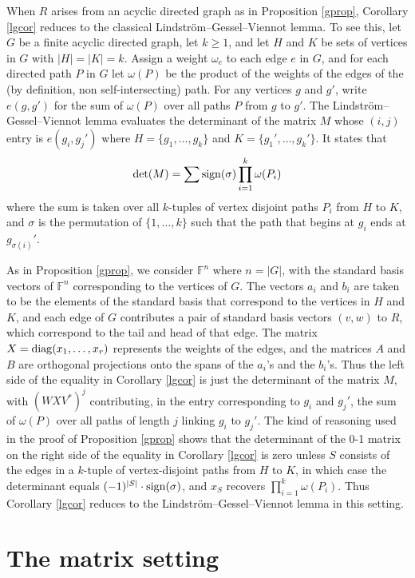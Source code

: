 \documentclass{amsart}
\theoremstyle{definition}
\begin{document}
When $R$ arises from an acyclic directed graph as in Proposition \ref{gprop}, Corollary \ref{lgcor} reduces to the classical Lindström–Gessel–Viennot lemma. To see this, let $G$ be a finite acyclic directed graph, let $k \geq 1$, and let $H$ and $K$ be sets of vertices in $G$ with $|H| = |K| = k$. Assign a weight $\omega_e$ to each edge $e$ in $G$, and for each directed path $P$ in $G$ let $\omega(P)$ be the product of the weights of the edges of the (by definition, non self-intersecting) path. For any vertices $g$ and $g'$, write $e(g, g')$ for the sum of $\omega(P)$ over all paths $P$ from $g$ to $g'$. The Lindström–Gessel–Viennot lemma evaluates the determinant of the matrix $M$ whose $(i,j)$ entry is $e(g_i, g_j')$ where $H = \{g_1, \ldots, g_k\}$ and $K = \{g_1', \ldots, g_k'\}$. It states that $${\rm det}(M) = \sum {\rm sign}(\sigma) \prod_{i=1}^k \omega(P_i)$$ where the sum is taken over all $k$-tuples of vertex disjoint paths $P_i$ from $H$ to $K$, and $\sigma$ is the permutation of $\{1, \ldots, k\}$ such that the path that begins at $g_i$ ends at $g_{\sigma(i)}'$.

As in Proposition \ref{gprop}, we consider $\mathbb{F}^n$ where $n = |G|$, with the standard basis vectors of $\mathbb{F}^n$ corresponding to the vertices of $G$. The vectors $a_i$ and $b_i$ are taken to be the elements of the standard basis that correspond to the vertices in $H$ and $K$, and each edge of $G$ contributes a pair of standard basis vectors $(v,w)$ to $R$, which correspond to the tail and head of that edge. The matrix $X = {\rm diag}(x_1, \ldots, x_r)$ represents the weights of the edges, and the matrices $A$ and $B$ are orthogonal projections onto the spans of the $a_i$'s and the $b_i$'s. Thus the left side of the equality in Corollary \ref{lgcor} is just the determinant of the matrix $M$, with $(WXV^*)^j$ contributing, in the entry corresponding to $g_i$ and $g_j'$, the sum of $\omega(P)$ over all paths of length $j$ linking $g_i$ to $g_j'$. The kind of reasoning used in the proof of Proposition \ref{gprop} shows that the determinant of the 0-1 matrix on the right side of the equality in Corollary \ref{lgcor} is zero unless $S$ consists of the edges in a $k$-tuple of vertex-disjoint paths from $H$ to $K$, in which case the determinant equals $(-1)^{|S|}\cdot {\rm sign}(\sigma)$, and $x_S$ recovers $\prod_{i=1}^k \omega(P_i)$. Thus Corollary \ref{lgcor} reduces to the Lindström–Gessel–Viennot lemma in this setting.

\section{The matrix setting}
\end{document}
